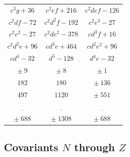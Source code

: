 \documentclass[11pt,a4paper]{article}
\theoremstyle{cayley}
\begin{document}
\begin{center}
\begin{tabular}{|c|c|c|}
$c^{3}g+36$ & $c^{2}ef+216$ & $c^{2}def-126$ \\
$c^{2}df-72$ & $c^{2}d^{2}f-192$ & $c^{2}e^{3}-27$ \\
$c^{2}e^{2}-27$ & $c^{2}de^{2}-378$ & $cd^{3}f+16$ \\
$c^{2}d^{2}e+96$ & $cd^{3}e+464$ & $cd^{2}e^{2}+96$ \\
$cd^{4}-32$ & $d^{5}-128$ & $d^{4}e-32$ \\
\hline
$\pm\ 9$ & $\pm\ 8$ & $\pm\ 1$ \\
$182$ & $180$ & $\pm\ 136$ \\
$497$ & $1120$ & $\pm\ 551$ \\
$\underline{\quad\quad}$ & $\underline{\quad\quad}$ & $\underline{\quad\quad}$ \\
$\pm\ 688$ & $\pm\ 1308$ & $\pm\ 688$ \\
\hline
\end{tabular}
\end{center}

\newpage

\subsection*{Covariants $N$ through $Z$}
\end{document}
